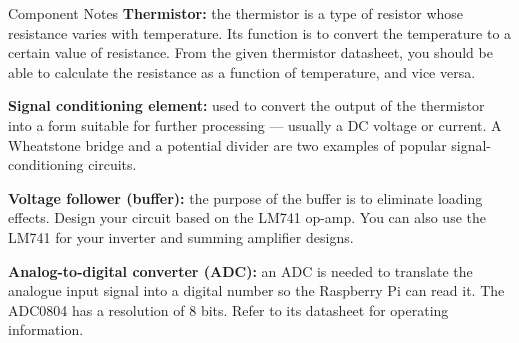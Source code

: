 \begin{labsection}{Component Notes}
  \textbf{Thermistor:} the thermistor is a type of resistor whose resistance varies with temperature. Its function is to convert the temperature to a certain value of resistance. From the given thermistor datasheet, you should be able to calculate the resistance as a function of temperature, and vice versa.
  \vspace*{1.5em}

  \textbf{Signal conditioning element:} used to convert the output of the thermistor into a form suitable for further processing --- usually a DC voltage or current. A Wheatstone bridge and a potential divider are two examples of popular signal-conditioning circuits.
  \vspace*{1.5em}

  \textbf{Voltage follower (buffer):} the purpose of the buffer is to eliminate loading effects. Design your circuit based on the LM741 op-amp. You can also use the LM741 for your inverter and summing amplifier designs.
  \vspace*{1.5em}

  \textbf{Analog-to-digital converter (ADC):} an ADC is needed to translate the analogue input signal into a digital number so the Raspberry Pi can read it. The ADC0804 has a resolution of 8 bits. Refer to its datasheet for operating information.
\end{labsection}

